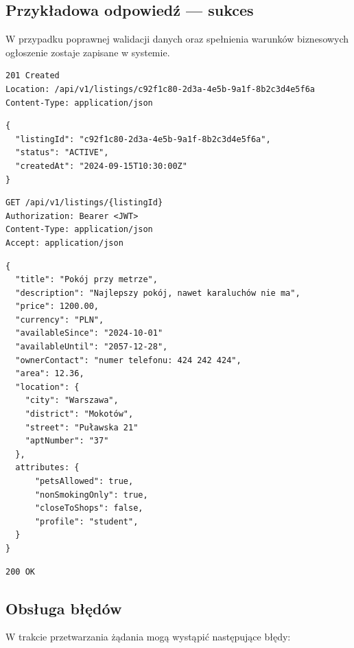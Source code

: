 \documentclass[11pt, a4paper]{article}
\begin{document}
\subsection{Przykładowa odpowiedź — sukces}

W przypadku poprawnej walidacji danych oraz spełnienia warunków biznesowych
ogłoszenie zostaje zapisane w systemie.

\begin{lstlisting}[style=http,caption={Odpowiedź HTTP — sukces}]
201 Created
Location: /api/v1/listings/c92f1c80-2d3a-4e5b-9a1f-8b2c3d4e5f6a
Content-Type: application/json  
\end{lstlisting}

\begin{lstlisting}[style=json,caption={Ciało odpowiedzi — sukces}]
{
  "listingId": "c92f1c80-2d3a-4e5b-9a1f-8b2c3d4e5f6a",
  "status": "ACTIVE",
  "createdAt": "2024-09-15T10:30:00Z"
}
\end{lstlisting}

\begin{lstlisting}[style=http,caption={Żądanie HTTP — pobranie szczegółów ogłoszenia}]
GET /api/v1/listings/{listingId}
Authorization: Bearer <JWT>
Content-Type: application/json
Accept: application/json
\end{lstlisting}

\begin{lstlisting}[style=json,caption={Ciało żądania — pobranie szczegółów ogłoszenia}]
{
  "title": "Pokój przy metrze",
  "description": "Najlepszy pokój, nawet karaluchów nie ma",
  "price": 1200.00,
  "currency": "PLN",
  "availableSince": "2024-10-01"
  "availableUntil": "2057-12-28",
  "ownerContact": "numer telefonu: 424 242 424",
  "area": 12.36,
  "location": {
    "city": "Warszawa",
    "district": "Mokotów",
    "street": "Puławska 21"
    "aptNumber": "37"
  },
  attributes: {
      "petsAllowed": true,
      "nonSmokingOnly": true,
      "closeToShops": false,
      "profile": "student",
  }
}
\end{lstlisting}

\begin{lstlisting}[style=http,caption={Odpowiedź HTTP — sukces}]
200 OK
\end{lstlisting}

\subsection{Obsługa błędów}

W trakcie przetwarzania żądania mogą wystąpić następujące błędy:
\end{document}
